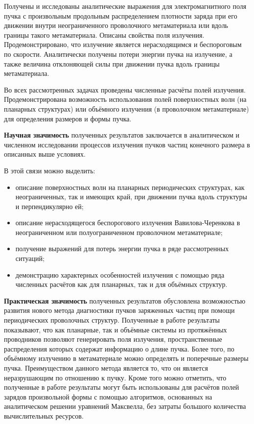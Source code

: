 Получены и исследованы аналитические выражения для электромагнитного поля пучка с произвольным продольным распределением плотности заряда при его движении внутри неограниченного проволочного метаматериала или вдоль границы такого метаматериала. Описаны свойства поля излучения. Продемонстрировано, что излучение является нерасходящимся и беспороговым по скорости. Аналитически получены потери энергии пучка на излучение, а также величина отклоняющей силы при движении пучка вдоль границы метаматериала.

Во всех рассмотренных задачах проведены численные расчёты полей излучения. Продемонстрирована возможность использования полей поверхностных волн (на планарных структурах) или объёмного излучения (в проволочном метаматериале) для определения размеров и формы пучка.

\hfill

\textbf{Научная значимость} полученных результатов заключается в аналитическом и численном исследовании процессов излучения пучков частиц конечного размера в описанных выше условиях.

В этой связи можно выделить:

\begin{itemize}
  \item описание поверхностных волн на планарных периодических структурах, как неограниченных, так и имеющих край, при движении пучка вдоль структуры и перпендикулярно ей;
  \item описание нерасходящегося беспорогового излучения Вавилова-Черенкова в неограниченном или полуограниченном проволочном метаматериале;
  \item получение выражений для потерь энергии пучка в ряде рассмотренных ситуаций;
  \item демонстрацию характерных особенностей излучения с помощью ряда численных расчётов как для планарных, так и для объёмных структур.
\end{itemize}

\hfill

\textbf{Практическая значимость} полученных результатов обусловлена возможностью развития нового метода диагностики пучков заряженных частиц при помощи периодических проволочных структур. Полученные в работе результаты показывают, что как планарные, так и объёмные системы из протяжённых проводников позволяют генерировать поля излучения, пространственные распределения которых содержат информацию о длине пучка. Более того, по объёмному излучению в метаматериале можно определять и поперечные размеры пучка. Преимуществом данного метода является то, что он является неразрушающим по отношению к пучку. Кроме того можно отметить, что полученные в работе результаты могут быть использованы для расчётов полей зарядов произвольной формы с помощью алгоритмов, основанных на аналитическом решении уравнений Максвелла, без затраты большого количества вычислительных ресурсов.

